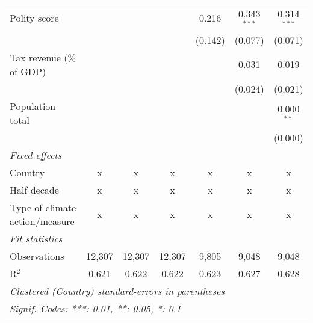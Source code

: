 \begin{tabular}{lcccccc}
   Polity score                                              &         &               &                & 0.216          & 0.343$^{***}$  & 0.314$^{***}$\\   
                                                             &         &               &                & (0.142)        & (0.077)        & (0.071)\\   
   Tax revenue (\% of GDP)                                   &         &               &                &                & 0.031          & 0.019\\   
                                                             &         &               &                &                & (0.024)        & (0.021)\\   
   Population total                                          &         &               &                &                &                & 0.000$^{**}$\\   
                                                             &         &               &                &                &                & (0.000)\\   
   \emph{Fixed effects}\\
   Country                                                   & x       & x             & x              & x              & x              & x\\  
   Half decade                                               & x       & x             & x              & x              & x              & x\\  
   Type of climate action/measure                            & x       & x             & x              & x              & x              & x\\  
   \midrule \emph{Fit statistics}\\
   Observations                                              & 12,307  & 12,307        & 12,307         & 9,805          & 9,048          & 9,048\\  
   R$^2$                                                     & 0.621   & 0.622         & 0.622          & 0.623          & 0.627          & 0.628\\  
   \midrule
   \multicolumn{7}{l}{\emph{Clustered (Country) standard-errors in parentheses}}\\
   \multicolumn{7}{l}{\emph{Signif. Codes: ***: 0.01, **: 0.05, *: 0.1}}\\
\end{tabular}
\par\endgroup


